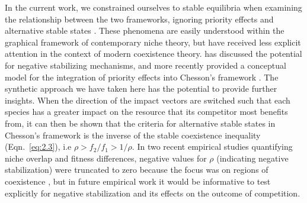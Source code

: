 In the current work, we constrained ourselves to stable equilibria when examining the relationship between the two frameworks, ignoring priority effects and alternative stable states \citep[\textit{sensu}][]{Fukami2015}. These phenomena are easily understood within the graphical framework of contemporary niche theory, but have received less explicit attention in the context of modern coexistence theory. \citet{Chesson2008} has discussed the potential for negative stabilizing mechanisms, and more recently \citet{Mordecai2011} provided a conceptual model for the integration of priority effects into Chesson's framework \citep[see also][]{Fukami2016}. The synthetic approach we have taken here has the potential to provide further insights. When the direction of the impact vectors are switched such that each species has a greater impact on the resource that its competitor most benefits from, it can then be shown that the criteria for alternative stable states in Chesson's framework is the inverse of the stable coexistence inequality (Eqn.~\ref{eq:2.3}), i.e $\rho > f_{2}/f_{1} > 1/\rho$. In two recent empirical studies quantifying niche overlap and fitness differences, negative values for $\rho$   (indicating negative stabilization) were truncated to zero because the focus was on regions of coexistence \citep{Godoy2014, Germain2016}, but in future empirical work it would be informative to test explicitly for negative stabilization and its effects on the outcome of competition.
\par


